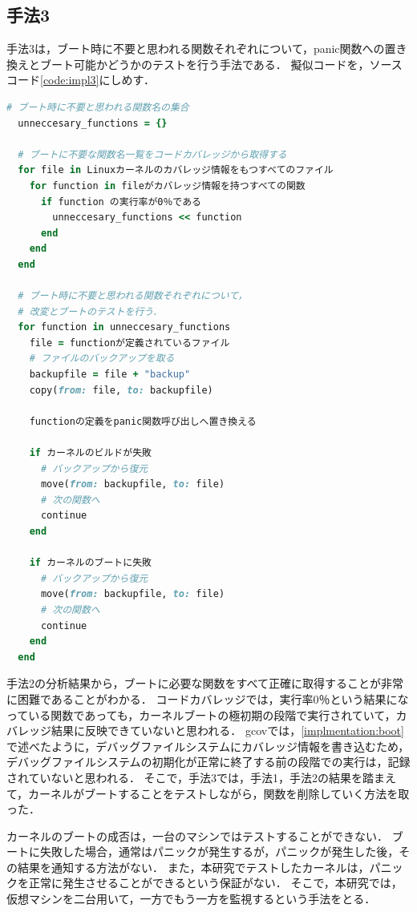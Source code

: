 \documentclass[graduation-thesis]{mlarticle}
\begin{document}
\subsection{手法3}
\label{implementation:3}
手法3は，ブート時に不要と思われる関数それぞれについて，panic関数への置き換えとブート可能かどうかのテストを行う手法である．
擬似コードを，ソースコード\ref{code:impl3}にしめす．

\begin{lstlisting}[language=ruby, caption=手法3の擬似コード, label=code:impl3]
  # ブート時に不要と思われる関数名の集合
  unneccesary_functions = {}

  # ブートに不要な関数名一覧をコードカバレッジから取得する
  for file in Linuxカーネルのカバレッジ情報をもつすべてのファイル
    for function in fileがカバレッジ情報を持つすべての関数
      if function の実行率が0％である
        unneccesary_functions << function
      end
    end
  end

  # ブート時に不要と思われる関数それぞれについて，
  # 改変とブートのテストを行う．
  for function in unneccesary_functions
    file = functionが定義されているファイル
    # ファイルのバックアップを取る
    backupfile = file + "backup"
    copy(from: file, to: backupfile)

    functionの定義をpanic関数呼び出しへ置き換える

    if カーネルのビルドが失敗
      # バックアップから復元
      move(from: backupfile, to: file)
      # 次の関数へ
      continue
    end

    if カーネルのブートに失敗
      # バックアップから復元
      move(from: backupfile, to: file)
      # 次の関数へ
      continue
    end
  end
\end{lstlisting}

手法2の分析結果から，ブートに必要な関数をすべて正確に取得することが非常に困難であることがわかる．
コードカバレッジでは，実行率0％という結果になっている関数であっても，カーネルブートの極初期の段階で実行されていて，カバレッジ結果に反映できていないと思われる．
gcovでは，\ref{implmentation:boot}で述べたように，デバッグファイルシステムにカバレッジ情報を書き込むため，デバッグファイルシステムの初期化が正常に終了する前の段階での実行は，記録されていないと思われる．
そこで，手法3では，手法1，手法2の結果を踏まえて，カーネルがブートすることをテストしながら，関数を削除していく方法を取った．

カーネルのブートの成否は，一台のマシンではテストすることができない．
ブートに失敗した場合，通常はパニックが発生するが，パニックが発生した後，その結果を通知する方法がない．
また，本研究でテストしたカーネルは，パニックを正常に発生させることができるという保証がない．
そこで，本研究では，仮想マシンを二台用いて，一方でもう一方を監視するという手法をとる．
\end{document}
